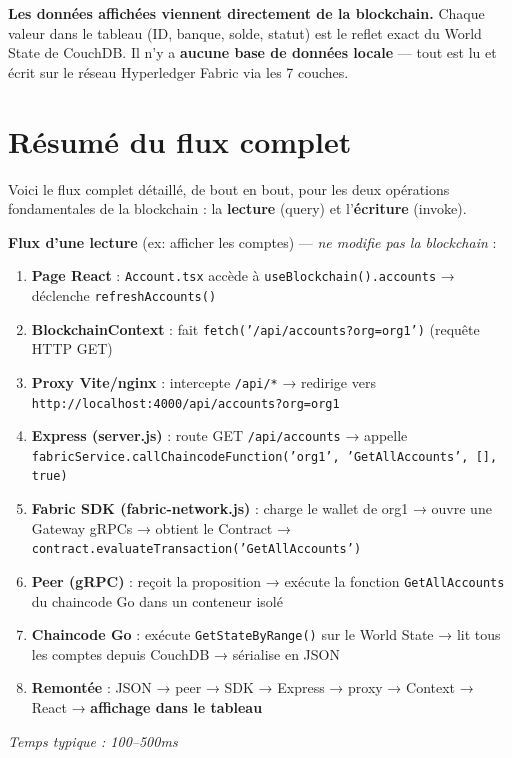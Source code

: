 \documentclass[12pt,a4paper,twoside]{report}
\begin{document}
\begin{warningbox}
\textbf{Les données affichées viennent directement de la blockchain.} Chaque valeur dans le tableau (ID, banque, solde, statut) est le reflet exact du World State de CouchDB. Il n'y a \textbf{aucune base de données locale} --- tout est lu et écrit sur le réseau Hyperledger Fabric via les 7 couches.
\end{warningbox}

\section{Résumé du flux complet}

Voici le flux complet détaillé, de bout en bout, pour les deux opérations fondamentales de la blockchain : la \textbf{lecture} (query) et l'\textbf{écriture} (invoke).

\begin{successbox}
\textbf{Flux d'une lecture} (ex: afficher les comptes) --- \textit{ne modifie pas la blockchain} :
\begin{enumerate}
    \item \textbf{Page React} : \texttt{Account.tsx} accède à \texttt{useBlockchain().accounts} → déclenche \texttt{refreshAccounts()}
    \item \textbf{BlockchainContext} : fait \texttt{fetch('/api/accounts?org=org1')} (requête HTTP GET)
    \item \textbf{Proxy Vite/nginx} : intercepte \texttt{/api/*} → redirige vers \texttt{http://localhost:4000/api/accounts?org=org1}
    \item \textbf{Express (server.js)} : route GET \texttt{/api/accounts} → appelle \texttt{fabricService.callChaincodeFunction('org1', 'GetAllAccounts', [], true)}
    \item \textbf{Fabric SDK (fabric-network.js)} : charge le wallet de org1 → ouvre une Gateway gRPCs → obtient le Contract → \texttt{contract.evaluateTransaction('GetAllAccounts')}
    \item \textbf{Peer (gRPC)} : reçoit la proposition → exécute la fonction \texttt{GetAllAccounts} du chaincode Go dans un conteneur isolé
    \item \textbf{Chaincode Go} : exécute \texttt{GetStateByRange()} sur le World State → lit tous les comptes depuis CouchDB → sérialise en JSON
    \item \textbf{Remontée} : JSON → peer → SDK → Express → proxy → Context → React → \textbf{affichage dans le tableau}
\end{enumerate}
\textit{Temps typique : 100--500ms}
\end{successbox}
\end{document}
